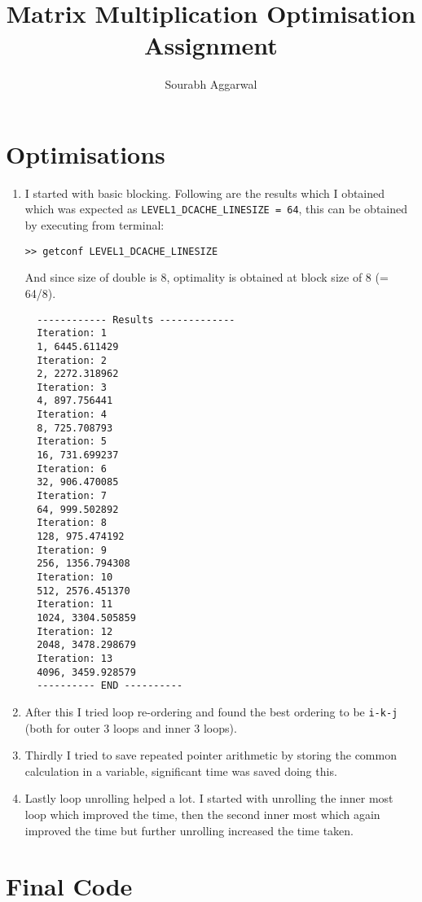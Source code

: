 \documentclass[12pt,3p]{elsarticle}
\begin{document}
\begin{frontmatter}
\title{Matrix Multiplication Optimisation Assignment}
\author{Sourabh Aggarwal}
\address{111601025@smail.iitpkd.ac.in}
\end{frontmatter}

\section{Optimisations}
\begin{enumerate}
  \item I started with basic blocking. Following are the results which I obtained which was expected as \texttt{LEVEL1\_DCACHE\_LINESIZE = 64}, this can be obtained by executing from terminal:
\begin{verbatim}
>> getconf LEVEL1_DCACHE_LINESIZE
\end{verbatim}
And since size of double is 8, optimality is obtained at block size of 8 (= 64/8).

\begin{verbatim}
  ------------ Results -------------
  Iteration: 1
  1, 6445.611429
  Iteration: 2
  2, 2272.318962
  Iteration: 3
  4, 897.756441
  Iteration: 4
  8, 725.708793
  Iteration: 5
  16, 731.699237
  Iteration: 6
  32, 906.470085
  Iteration: 7
  64, 999.502892
  Iteration: 8
  128, 975.474192
  Iteration: 9
  256, 1356.794308
  Iteration: 10
  512, 2576.451370
  Iteration: 11
  1024, 3304.505859
  Iteration: 12
  2048, 3478.298679
  Iteration: 13
  4096, 3459.928579
  ---------- END ----------
\end{verbatim}

\item After this I tried loop re-ordering and found the best ordering to be \texttt{i-k-j} (both for outer 3 loops and inner 3 loops). 

\item Thirdly I tried to save repeated pointer arithmetic by storing the common calculation in a variable, significant time was saved doing this. 

\item Lastly loop unrolling helped a lot. I started with unrolling the inner most loop which improved the time, then the second inner most which again improved the time but further unrolling increased the time taken.

\end{enumerate}

\section{Final Code}
\end{document}
